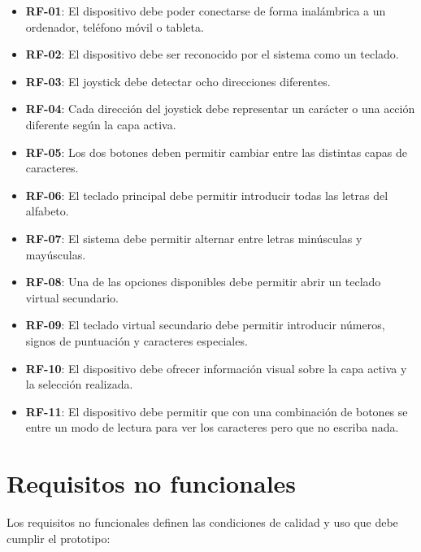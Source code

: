 \begin{itemize}
    \item \textbf{RF-01}: El dispositivo debe poder conectarse de forma inalámbrica a un ordenador, teléfono móvil o tableta.

    \item \textbf{RF-02}: El dispositivo debe ser reconocido por el sistema como un teclado.

    \item \textbf{RF-03}: El joystick debe detectar ocho direcciones diferentes.

    \item \textbf{RF-04}: Cada dirección del joystick debe representar un carácter o una acción diferente según la capa activa.

    \item \textbf{RF-05}: Los dos botones deben permitir cambiar entre las distintas capas de caracteres.

    \item \textbf{RF-06}: El teclado principal debe permitir introducir todas las letras del alfabeto.

    \item \textbf{RF-07}: El sistema debe permitir alternar entre letras minúsculas y mayúsculas.

    \item \textbf{RF-08}: Una de las opciones disponibles debe permitir abrir un teclado virtual secundario.

    \item \textbf{RF-09}: El teclado virtual secundario debe permitir introducir números, signos de puntuación y caracteres especiales.

    \item \textbf{RF-10}: El dispositivo debe ofrecer información visual sobre la capa activa y la selección realizada.

    \item \textbf{RF-11}: El dispositivo debe permitir que con una combinación de botones se entre un modo de lectura para ver los caracteres pero que no escriba nada.
\end{itemize}

\section{Requisitos no funcionales}
\label{sec:requisitos-no-funcionales}

Los requisitos no funcionales definen las condiciones de calidad y uso que debe cumplir el prototipo:

